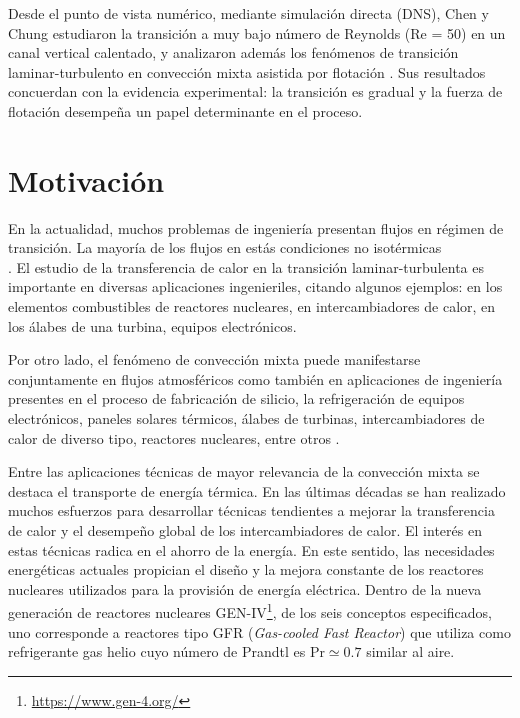 Desde el punto de vista numérico, mediante simulación directa (DNS), Chen y Chung \cite{chen2002direct} estudiaron la transición a muy bajo número de Reynolds (Re = 50) en un canal vertical calentado, y analizaron además los fenómenos de transición laminar-turbulento en convección mixta asistida por flotación \linebreak \cite{chen2003direct}. Sus resultados concuerdan con la evidencia experimental: la transición es gradual y la fuerza de flotación desempeña un papel determinante en el proceso.

\section{Motivación}

En la actualidad, muchos problemas de ingeniería presentan flujos en régimen de transición. La mayoría de los flujos en estás condiciones no isotérmicas \\ \cite{chen2003direct}. El estudio de la transferencia de calor en la transición laminar-turbulenta es importante en diversas aplicaciones ingenieriles, citando algunos ejemplos: en los elementos combustibles de reactores nucleares, en intercambiadores de calor, en los álabes de una turbina, equipos electrónicos.

Por otro lado, el fenómeno de convección mixta puede manifestarse conjuntamente en flujos atmosféricos \cite{pirozzoli2017mixed} como también en aplicaciones de ingeniería presentes en el proceso de fabricación de silicio, la refrigeración de equipos electrónicos, paneles solares térmicos, álabes de turbinas, intercambiadores de calor de diverso tipo, reactores nucleares, entre otros \cite{kasagi1997direct}. 

Entre las aplicaciones técnicas de mayor relevancia de la convección mixta se destaca el transporte de energía térmica. En las últimas décadas se han realizado muchos esfuerzos para desarrollar técnicas tendientes a mejorar la transferencia de calor y el desempeño global de los intercambiadores de calor. El interés en estas técnicas radica en el ahorro de la energía. En este sentido, las necesidades energéticas actuales propician el diseño y la mejora constante de los reactores nucleares utilizados para la provisión de energía eléctrica. Dentro de la nueva generación de reactores nucleares GEN-IV\footnote{\url{https://www.gen-4.org/}}, de los seis conceptos especificados, uno corresponde a reactores tipo GFR (\textit{Gas-cooled Fast Reactor}) que utiliza como refrigerante gas helio cuyo número de Prandtl es Pr$\simeq0.7$ similar al aire.


